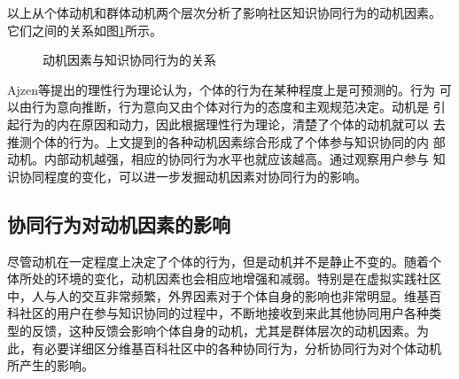 以上从个体动机和群体动机两个层次分析了影响社区知识协同行为的动机因素。
它们之间的关系如图\ref{fig:motivation}所示。
\begin{figure}
 
    \centering
    \caption{\small{动机因素与知识协同行为的关系}}
  \label{fig:motivation}
  \end{figure}

Ajzen等提出的理性行为理论认为，个体的行为在某种程度上是可预测的。行为
可以由行为意向推断，行为意向又由个体对行为的态度和主观规范决定。动机是
引起行为的内在原因和动力，因此根据理性行为理论，清楚了个体的动机就可以
去推测个体的行为。上文提到的各种动机因素综合形成了个体参与知识协同的内
部动机。内部动机越强，相应的协同行为水平也就应该越高。通过观察用户参与
知识协同程度的变化，可以进一步发掘动机因素对协同行为的影响。

\subsection{协同行为对动机因素的影响}

尽管动机在一定程度上决定了个体的行为，但是动机并不是静止不变的。随着个
体所处的环境的变化，动机因素也会相应地增强和减弱。特别是在虚拟实践社区
中，人与人的交互非常频繁，外界因素对于个体自身的影响也非常明显。维基百
科社区的用户在参与知识协同的过程中，不断地接收到来此其他协同用户各种类
型的反馈，这种反馈会影响个体自身的动机，尤其是群体层次的动机因素。为
此，有必要详细区分维基百科社区中的各种协同行为，分析协同行为对个体动机
所产生的影响。

